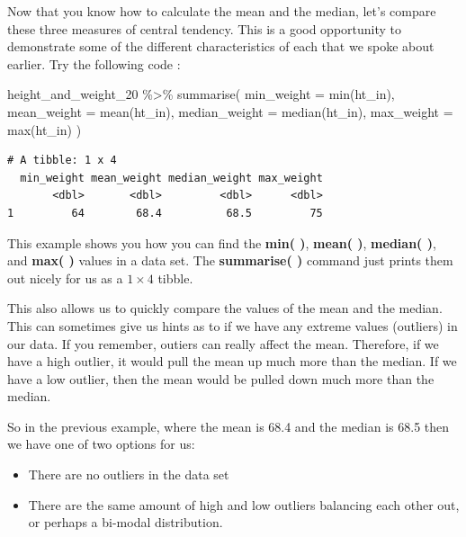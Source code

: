\documentclass[
  letterpaper,
  DIV=11,
  numbers=noendperiod]{scrreprt}
\newenvironment{Shaded}{\begin{snugshade}}{\end{snugshade}}
\newcommand{\AttributeTok}[1]{\textcolor[rgb]{0.40,0.45,0.13}{#1}}
\newcommand{\FunctionTok}[1]{\textcolor[rgb]{0.28,0.35,0.67}{#1}}
\newcommand{\NormalTok}[1]{\textcolor[rgb]{0.00,0.23,0.31}{#1}}
\newcommand{\SpecialCharTok}[1]{\textcolor[rgb]{0.37,0.37,0.37}{#1}}
\providecommand{\tightlist}{%
  \setlength{\itemsep}{0pt}\setlength{\parskip}{0pt}}\usepackage{longtable,booktabs,array}
\begin{document}
Now that you know how to calculate the mean and the median, let's
compare these three measures of central tendency. This is a good
opportunity to demonstrate some of the different characteristics of each
that we spoke about earlier. Try the following code :

\begin{Shaded}
\begin{Highlighting}[]
\NormalTok{height\_and\_weight\_20 }\SpecialCharTok{\%\textgreater{}\%} 
  \FunctionTok{summarise}\NormalTok{(}
    \AttributeTok{min\_weight    =} \FunctionTok{min}\NormalTok{(ht\_in),}
    \AttributeTok{mean\_weight   =} \FunctionTok{mean}\NormalTok{(ht\_in),}
    \AttributeTok{median\_weight =} \FunctionTok{median}\NormalTok{(ht\_in),}
    \AttributeTok{max\_weight    =} \FunctionTok{max}\NormalTok{(ht\_in)}
\NormalTok{  )}
\end{Highlighting}
\end{Shaded}

\begin{verbatim}
# A tibble: 1 x 4
  min_weight mean_weight median_weight max_weight
       <dbl>       <dbl>         <dbl>      <dbl>
1         64        68.4          68.5         75
\end{verbatim}

This example shows you how you can find the \textbf{min( )},
\textbf{mean( )}, \textbf{median( )}, and \textbf{max( )} values in a
data set. The \textbf{summarise( )} command just prints them out nicely
for us as a \(1 \times 4\) tibble.

This also allows us to quickly compare the values of the mean and the
median. This can sometimes give us hints as to if we have any extreme
values (outliers) in our data. If you remember, outiers can really
affect the mean. Therefore, if we have a high outlier, it would pull the
mean up much more than the median. If we have a low outlier, then the
mean would be pulled down much more than the median.

So in the previous example, where the mean is 68.4 and the median is
68.5 then we have one of two options for us:

\begin{itemize}
\tightlist
\item
  There are no outliers in the data set
\item
  There are the same amount of high and low outliers balancing each
  other out, or perhaps a bi-modal distribution.
\end{itemize}
\end{document}
